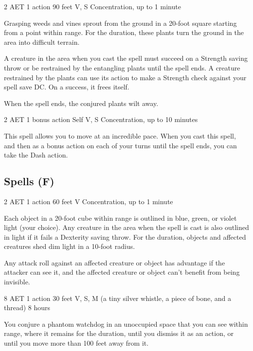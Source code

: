 {2 AET}
{1 action}
{90 feet}
{V, S}
{Concentration, up to 1 minute}

Grasping weeds and vines sprout from the ground in a 20-foot square starting from a point within range. For the duration, these plants turn the ground in the area into difficult terrain.

A creature in the area when you cast the spell must succeed on a Strength saving throw or be restrained by the entangling plants until the spell ends. A creature restrained by the plants can use its action to make a Strength check against your spell save DC. On a success, it frees itself.

When the spell ends, the conjured plants wilt away.


{2 AET}
{1 bonus action}
{Self}
{V, S}
{Concentration, up to 10 minutes}

This spell allows you to move at an incredible pace. When you cast this spell, and then as a bonus action on each of your turns until the spell ends, you can take the Dash action.

\subsection{Spells (F)}


{2 AET}
{1 action}
{60 feet}
{V}
{Concentration, up to 1 minute}

Each object in a 20-foot cube within range is outlined in blue, green, or violet light (your choice). Any creature in the area when the spell is cast is also outlined in light if it fails a Dexterity saving throw. For the duration, objects and affected creatures shed dim light in a 10-foot radius.

Any attack roll against an affected creature or object has advantage if the attacker can see it, and the affected creature or object can't benefit from being invisible.


{8 AET}
{1 action}
{30 feet}
{V, S, M (a tiny silver whistle, a piece of bone, and a thread)}
{8 hours}

You conjure a phantom watchdog in an unoccupied space that you can see within range, where it remains for the duration, until you dismiss it as an action, or until you move more than 100 feet away from it.

